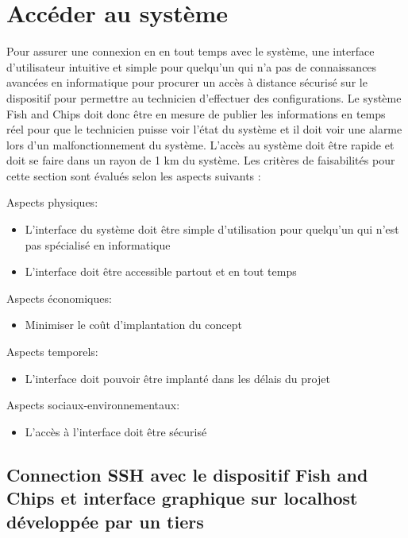 

\section{Accéder au système}
\label{s:faisab_acceder}
Pour assurer une connexion en en tout temps avec le système, une interface d’utilisateur intuitive et simple pour quelqu’un qui n’a pas de connaissances avancées en informatique pour procurer un accès à distance sécurisé sur le dispositif pour permettre au technicien d’effectuer des configurations. Le système Fish and Chips doit donc être en mesure de publier les informations en temps réel pour que le technicien puisse voir l’état du système et il doit voir une alarme lors d’un malfonctionnement du système. L’accès au système doit être rapide et doit se faire dans un rayon de 1 km du système. Les critères de faisabilités pour cette section sont évalués selon les aspects suivants :

Aspects physiques:
\begin{itemize}
	\item L’interface du système doit être simple d’utilisation pour quelqu’un qui n’est pas spécialisé en informatique
	\item L’interface doit être accessible partout et en tout temps
\end{itemize}

Aspects économiques:
\begin{itemize}
	\item Minimiser le coût d’implantation du concept
\end{itemize}

Aspects temporels:
\begin{itemize}
	\item L’interface doit pouvoir être implanté dans les délais du projet
\end{itemize}

Aspects sociaux-environnementaux:
\begin{itemize}
	\item L’accès à l’interface doit être sécurisé
\end{itemize}

\subsection{Connection SSH avec le dispositif Fish and Chips et interface graphique sur localhost développée par un tiers}

